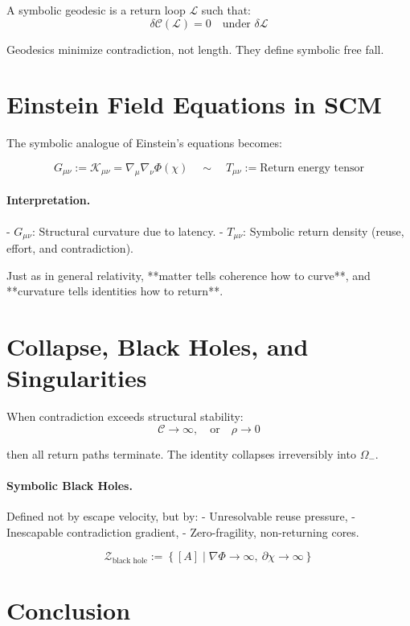 \begin{definition}
A symbolic geodesic is a return loop $\mathcal{L}$ such that:
\[
\delta \mathcal{C}(\mathcal{L}) = 0
\quad \text{under } \delta \mathcal{L}
\]
\end{definition}

Geodesics minimize contradiction, not length. They define symbolic free fall.

\section{Einstein Field Equations in SCM}

The symbolic analogue of Einstein's equations becomes:

\[
G_{\mu\nu} := \mathcal{K}_{\mu\nu} = \nabla_\mu \nabla_\nu \Phi(\chi)
\quad \sim \quad T_{\mu\nu} := \text{Return energy tensor}
\]

\paragraph{Interpretation.}
- $G_{\mu\nu}$: Structural curvature due to latency.
- $T_{\mu\nu}$: Symbolic return density (reuse, effort, and contradiction).

Just as in general relativity, **matter tells coherence how to curve**, and **curvature tells identities how to return**.

\section{Collapse, Black Holes, and Singularities}

When contradiction exceeds structural stability:
\[
\mathcal{C} \to \infty,\quad \text{or} \quad \rho \to 0
\]

then all return paths terminate. The identity collapses irreversibly into $\Omega_-$.

\paragraph{Symbolic Black Holes.}
Defined not by escape velocity, but by:
- Unresolvable reuse pressure,
- Inescapable contradiction gradient,
- Zero-fragility, non-returning cores.

\[
\mathcal{Z}_\text{black hole} := \left\{ [A] \mid \nabla \Phi \to \infty,\ \partial \chi \to \infty \right\}
\]

\section{Conclusion}

